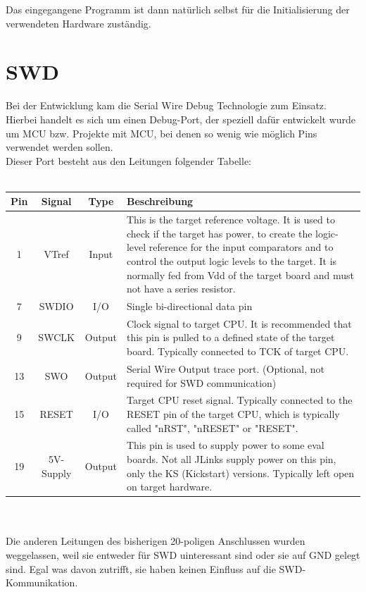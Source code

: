 Das eingegangene Programm ist dann nat\"urlich selbst f\"ur die Initialisierung
der verwendeten Hardware zust\"andig.\\

\section{SWD}
Bei der Entwicklung kam die Serial Wire Debug Technologie zum Einsatz. Hierbei 
handelt es sich um einen Debug-Port, der speziell daf\"ur entwickelt wurde
 um MCU bzw. Projekte mit MCU, bei denen so wenig wie m\"oglich Pins verwendet
 werden sollen. \\
Dieser Port besteht aus den Leitungen folgender Tabelle:\\\\
\begin{tabular}{|c|c|c|p{10cm}|}
\hline \hline
	Pin & Signal & Type & Beschreibung \\ \hline
1 & VTref & Input & This is the target reference voltage. It is used to
 check if the target has power, to create the logic-level reference for
 the input comparators and to control the output logic levels to the target.
 It is normally fed from Vdd of the target board and must not have a series resistor.\\ \hline
7 & SWDIO & I/O & Single bi-directional data pin\\ \hline
9 & SWCLK & Output & Clock signal to target CPU. It is recommended that
 this pin is pulled to a defined state of the target board. Typically
 connected to TCK of target CPU.\\ \hline
13 & SWO & Output & Serial Wire Output trace port. (Optional, not required
for SWD communication)\\ \hline
15 & RESET & I/O & Target CPU reset signal. Typically connected to the
 RESET pin of the target CPU, which is typically called "nRST", "nRESET"
 or "RESET".\\ \hline
19 & 5V-Supply & Output & This pin is used to supply power to some eval boards.
Not all JLinks supply power on this pin, only the KS (Kickstart) versions.
Typically left open on target hardware.\\ \hline
\end{tabular}\\\\

Die anderen Leitungen des bisherigen 20-poligen Anschlussen wurden weggelassen,
weil sie entweder f\"ur SWD uinteressant sind oder sie auf GND gelegt sind. Egal
was davon zutrifft, sie haben keinen Einfluss auf die SWD-Kommunikation.

